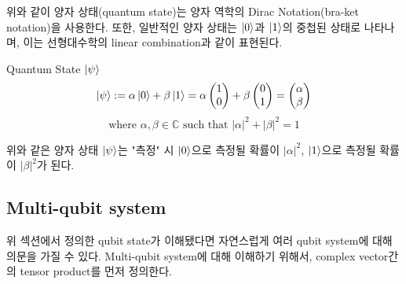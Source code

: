 위와 같이 양자 상태(quantum state)는 양자 역학의 Dirac Notation(bra-ket notation)을 사용한다. 또한, 일반적인 양자 상태는 \(\ket{0}\)과 \(\ket{1}\)의 중첩된 상태로 나타나며, 이는 선형대수학의 linear combination과 같이 표현된다.

\begin{definition}
 Quantum State \( \ket{\psi} \)
\[
    \ket{\psi} := \alpha \ket{0} + \beta \ket{1} = \alpha \begin{pmatrix} 1 \\ 0 \end{pmatrix} + \beta \begin{pmatrix} 0 \\ 1 \end{pmatrix} = \begin{pmatrix} \alpha \\ \beta \end{pmatrix}
\]
\[
    \text{where } \alpha, \beta \in \mathbb{C} \text{ such that } |\alpha|^2 + |\beta|^2 = 1
\]
\end{definition}

위와 같은 양자 상태 \( \ket\psi \)는 "측정" 시 \(\ket 0\)으로 측정될 확률이 \(|\alpha|^2\), \(\ket 1\)으로 측정될 확률이 \(|\beta|^2\)가 된다. %

\subsection{Multi-qubit system}

위 섹션에서 정의한 qubit state가 이해됐다면 자연스럽게 여러 qubit system에 대해 의문을 가질 수 있다. Multi-qubit system에 대해 이해하기 위해서, complex vector간의 tensor product를 먼저 정의한다.

